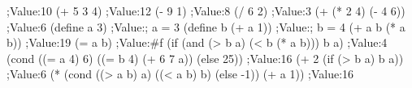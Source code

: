 \begtt{}
;Value:10
(+ 5 3 4)
;Value:12
(- 9 1)
;Value:8
(/ 6 2)
;Value:3
(+ (* 2 4) (- 4 6))
;Value:6
(define a 3)
;Value:; a = 3
(define b (+ a 1))
;Value:; b = 4
(+ a b (* a b))
;Value:19
(= a b)
;Value:#f
(if (and (> b a) (< b (* a b)))
        b
        a)
;Value:4
(cond ((= a 4) 6)
          ((= b 4) (+ 6 7 a))
          (else 25))
;Value:16
(+ 2 (if (> b a) b a))
;Value:6
(* (cond ((> a b) a)
             ((< a b) b)
             (else -1))
       (+ a 1))
;Value:16
\endtt
